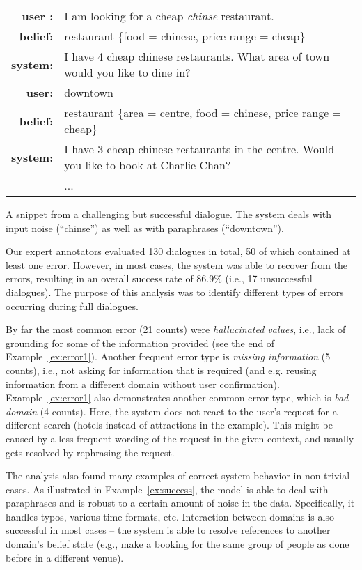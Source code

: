 \documentclass[11pt]{article}
\newcommand{\exampleref}[1]{Example~\ref{#1}}
\begin{document}
\begin{example}[ht!]
\small
\setlength{\tabcolsep}{2pt}
\begin{mdframed}[style=ExampleFrame]
\begin{tabularx}{\textwidth}{rX}
\bf user : & I am looking for a cheap \textit{chinse} restaurant. \\
\bf belief: & restaurant \{food = chinese, price range = cheap\} \\
\bf system: & I have 4 cheap chinese restaurants. What area of town would you like to dine in?\\
\bf user: & downtown   \\ 
\bf belief: & restaurant \{area = centre, food = chinese, price range = cheap\} \\
\bf system: & I have 3 cheap chinese restaurants in the centre. Would you like to book at Charlie Chan?\\
 & ... \\

\end{tabularx}
\end{mdframed}
\caption{A snippet from a challenging but successful dialogue. The system deals with input noise (“chinse”) as well as with paraphrases (“downtown”). \label{ex:success}}
\end{example}
Our expert annotators evaluated 130 dialogues in total, 50 of which contained at least one error.
However, in most cases, the system was able to recover from the errors, resulting in an overall success rate of 86.9\% (i.e., 17 unsuccessful dialogues).
The purpose of this analysis was to identify different types of errors occurring during full dialogues.

By far the most common error  (21 counts) were \emph{hallucinated values}, i.e., lack of grounding for some of the information provided (see the end of \exampleref{ex:error1}).
Another frequent error type is \emph{missing information} (5 counts), i.e., not asking for information that is required (and e.g. reusing information from a different domain without user confirmation).
Example~\ref{ex:error1} also demonstrates another common error type, which is \emph{bad domain} (4 counts). Here, the system does not react to the user's request for a different search (hotels instead of attractions in the example). This might be caused by a less frequent wording of the request in the given context, and usually gets resolved by rephrasing the request.

The analysis also found many examples of correct system behavior in non-trivial cases.
As illustrated in Example~\ref{ex:success},
the model is able to deal with paraphrases and is robust to a certain amount of noise in the data. Specifically, it handles typos, various time formats, etc.
Interaction between domains is also successful in most cases -- the system is able to resolve references to another domain's belief state (e.g., make a booking for the same group of people as done before in a different venue).
\end{document}
